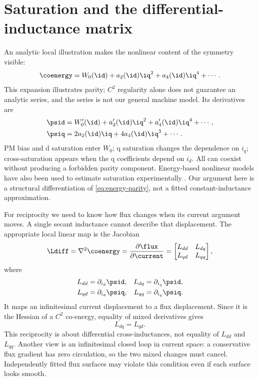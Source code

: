 \section{Saturation and the differential-inductance matrix}
An analytic local illustration makes the nonlinear content of the symmetry
visible:
\begin{equation}
 \coenergy=W_0(\id)+a_2(\id)\iq^2+a_4(\id)\iq^4+\cdots.
 \label{eq:local-energy}
\end{equation}
This expansion illustrates parity; $C^2$ regularity alone does not guarantee
an analytic series, and the series is not our general machine model. Its
derivatives are
\begin{align}
 \psid&=W_0'(\id)+a_2'(\id)\iq^2+a_4'(\id)\iq^4+\cdots,\\
 \psiq&=2a_2(\id)\iq+4a_4(\id)\iq^3+\cdots.
\end{align}
PM bias and d saturation enter $W_0$; q saturation changes the dependence on
$i_q$; cross-saturation appears when the q coefficients depend on $i_d$.
All can coexist without producing a forbidden parity component. Energy-based
nonlinear models have also been used to estimate saturation experimentally
\cite{jebai2011}. Our argument here is a structural differentiation of
\cref{eq:energy-parity}, not a fitted constant-inductance approximation.

For reciprocity we need to know how flux changes when its current
argument moves. A single secant inductance cannot describe that displacement.
The appropriate local linear map is the Jacobian
\begin{equation}
 \Ldiff=\nabla^2\coenergy=\frac{\partial\flux}{\partial\current}
 =\begin{bmatrix}L_{dd}&L_{dq}\\L_{qd}&L_{qq}\end{bmatrix},
 \label{eq:jacobian}
\end{equation}
where
\begin{align}
 L_{dd}&=\partial_{i_d}\psid,&L_{dq}&=\partial_{i_q}\psid,\\
 L_{qd}&=\partial_{i_d}\psiq,&L_{qq}&=\partial_{i_q}\psiq.
\end{align}
It maps an infinitesimal current displacement to a flux displacement. Since
it is the Hessian of a $C^2$ co-energy, equality of mixed derivatives gives
\begin{equation}
 \boxed{L_{dq}=L_{qd}.}\label{eq:reciprocity}
\end{equation}
This reciprocity is about differential cross-inductances, not equality of
$L_{dd}$ and $L_{qq}$. Another view is an infinitesimal closed loop in current
space: a conservative flux gradient has zero circulation, so the two mixed
changes must cancel. Independently fitted flux surfaces may violate this
condition even if each surface looks smooth.


